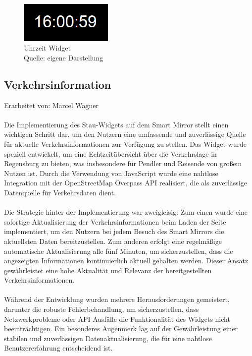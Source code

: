 \begin{figure}[h]
    \centering
    \includegraphics[width=0.4\textwidth]{pictures/time_widget.png}
  \captionsetup{justification=centering, labelformat=simple, singlelinecheck=false}
    \caption{ Uhrzeit Widget\\ Quelle: eigene Darstellung}
\end{figure}

\subsection{Verkehrsinformation}
Erarbeitet von: Marcel Wagner \\ \\
\noindent
Die Implementierung des Stau-Widgets auf dem Smart Mirror stellt einen wichtigen Schritt dar, um den Nutzern eine umfassende und zuverlässige Quelle für aktuelle Verkehrsinformationen zur Verfügung zu stellen. Das Widget wurde speziell entwickelt, um eine Echtzeitübersicht über die Verkehrslage in Regensburg zu bieten, was insbesondere für Pendler und Reisende von großem Nutzen ist. Durch die Verwendung von JavaScript wurde eine nahtlose Integration mit der OpenStreetMap Overpass API realisiert, die als zuverlässige Datenquelle für Verkehrsdaten dient. \\ \\
\noindent
Die Strategie hinter der Implementierung war zweigleisig: Zum einen wurde eine sofortige Aktualisierung der Verkehrsinformationen beim Laden der Seite implementiert, um den Nutzern bei jedem Besuch des Smart Mirrors die aktuellsten Daten bereitzustellen. Zum anderen erfolgt eine regelmäßige automatische Aktualisierung alle fünf Minuten, um sicherzustellen, dass die angezeigten Informationen kontinuierlich aktuell gehalten werden. Dieser Ansatz gewährleistet eine hohe Aktualität und Relevanz der bereitgestellten Verkehrsinformationen. \\ \\
\noindent
Während der Entwicklung wurden mehrere Herausforderungen gemeistert, darunter die robuste Fehlerbehandlung, um sicherzustellen, dass Netzwerkprobleme oder API Ausfälle die Funktionalität des Widgets nicht beeinträchtigen. Ein besonderes Augenmerk lag auf der Gewährleistung einer stabilen und zuverlässigen Datenaktualisierung, die für eine nahtlose Benutzererfahrung entscheidend ist. \\ \\
